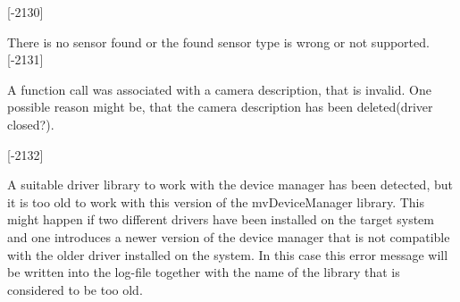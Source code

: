 \begin{Desc}
\begin{description}
{\bfseries }\mbox{[}-\/2130\mbox{]} \item[{\em 
\hypertarget{group___common_interface_gga112225e5fbaaaef6445ff4ebf98f8e03a47563d2a64e0496bf6d422470eb605fd}{D\+E\+V\+\_\+\+S\+E\+N\+S\+O\+R\+\_\+\+T\+Y\+P\+E\+\_\+\+E\+R\+R\+O\+R}\label{group___common_interface_gga112225e5fbaaaef6445ff4ebf98f8e03a47563d2a64e0496bf6d422470eb605fd}
}]There is no sensor found or the found sensor type is wrong or not supported. {\bfseries }\mbox{[}-\/2131\mbox{]} \item[{\em 
\hypertarget{group___common_interface_gga112225e5fbaaaef6445ff4ebf98f8e03abbbd5140eb02346a0e6bb08bf532b2bd}{D\+M\+R\+\_\+\+C\+A\+M\+E\+R\+A\+\_\+\+D\+E\+S\+C\+R\+I\+P\+T\+I\+O\+N\+\_\+\+I\+N\+V\+A\+L\+I\+D}\label{group___common_interface_gga112225e5fbaaaef6445ff4ebf98f8e03abbbd5140eb02346a0e6bb08bf532b2bd}
}]A function call was associated with a camera description, that is invalid. One possible reason might be, that the camera description has been deleted(driver closed?).

{\bfseries }\mbox{[}-\/2132\mbox{]} \item[{\em 
\hypertarget{group___common_interface_gga112225e5fbaaaef6445ff4ebf98f8e03a9d65d30e67d753cfc8904879d6ff4b7e}{D\+M\+R\+\_\+\+N\+E\+W\+E\+R\+\_\+\+L\+I\+B\+R\+A\+R\+Y\+\_\+\+R\+E\+Q\+U\+I\+R\+E\+D}\label{group___common_interface_gga112225e5fbaaaef6445ff4ebf98f8e03a9d65d30e67d753cfc8904879d6ff4b7e}
}]A suitable driver library to work with the device manager has been detected, but it is too old to work with this version of the mv\+Device\+Manager library. This might happen if two different drivers have been installed on the target system and one introduces a newer version of the device manager that is not compatible with the older driver installed on the system. In this case this error message will be written into the log-\/file together with the name of the library that is considered to be too old.


\end{description}
\end{Desc}
